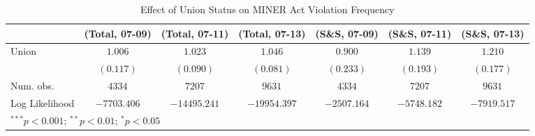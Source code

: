 
\begin{table}
\begin{center}
\begin{tabular}{l c c c c c c}
\hline
 & (Total, 07-09) & (Total, 07-11) & (Total, 07-13) & (S\&S, 07-09) & (S\&S, 07-11) & (S\&S, 07-13) \\
\hline
Union          & $1.006$     & $1.023$      & $1.046$      & $0.900$     & $1.139$     & $1.210$     \\
               & $(0.117)$   & $(0.090)$    & $(0.081)$    & $(0.233)$   & $(0.193)$   & $(0.177)$   \\
\hline
Num. obs.      & $4334$      & $7207$       & $9631$       & $4334$      & $7207$      & $9631$      \\
Log Likelihood & $-7703.406$ & $-14495.241$ & $-19954.397$ & $-2507.164$ & $-5748.182$ & $-7919.517$ \\
\hline
\multicolumn{7}{l}{\scriptsize{$^{***}p<0.001$; $^{**}p<0.01$; $^{*}p<0.05$}}
\end{tabular}
\caption{Effect of Union Status on MINER Act Violation Frequency}
\label{irr_100employees_mineract_violations}
\end{center}
\end{table}

